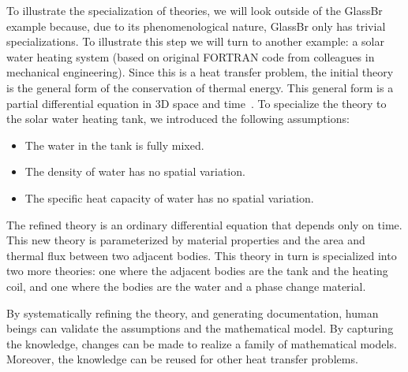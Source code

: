 \documentclass[sigconf,review,anonymous=false]{acmart}
\begin{document}
To illustrate the specialization of theories, we will look outside of the
GlassBr example because, due to its phenomenological nature, GlassBr only has
trivial specializations.  To illustrate this step we will turn to another
example: a solar water heating system (based on original FORTRAN code from
colleagues in mechanical engineering).  Since this is a heat transfer problem,
the initial theory is the general form of the conservation of thermal energy.
This general form is a partial differential equation in 3D space and
time~\cite{BirdEtAl2002}.  To specialize the theory to the solar water heating
tank, we introduced the following assumptions:

\begin{itemize}

\item The water in the tank is fully mixed.

\item The density of water has no spatial variation.

\item The specific heat capacity of water has no spatial variation.

\end{itemize}

The refined theory is an ordinary differential equation that depends only on
time.  This new theory is parameterized by material properties and the area and
thermal flux between two adjacent bodies. This theory in turn is specialized
into two more theories: one where the adjacent bodies are the tank and the
heating coil, and one where the bodies are the water and a phase change
material.

By systematically refining the theory, and generating documentation, human
beings can validate the assumptions and the mathematical model. By capturing the
knowledge, changes can be made to realize a family of mathematical models.
Moreover, the knowledge can be reused for other heat transfer problems.

%
%
%
%
\end{document}
